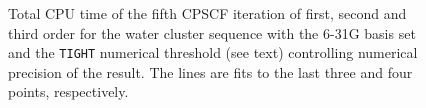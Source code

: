 \documentclass[prl,aps,letterpaper,twocolumn,showpacs,twocolumngrid,superbib]{revtex4}
\begin{document}
\begin{figure}[t]
  \caption{\protect
    Total CPU time of the fifth CPSCF iteration of first, second 
    and third order for the water cluster sequence with the 6-31G
    basis set and the {\tt TIGHT} numerical threshold (see text) 
    controlling numerical precision of the result. The lines
    are fits to the last three and four points, respectively.
  }\label{fig:Mix_scaling}
\end{figure}
\end{document}
